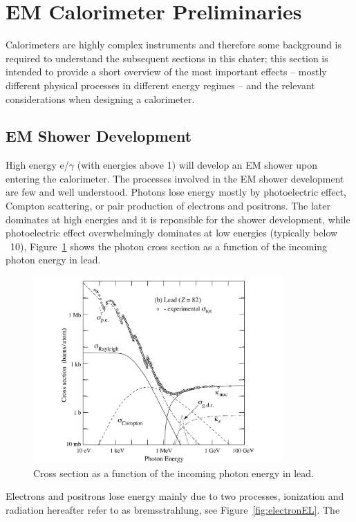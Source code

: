 \section{EM Calorimeter Preliminaries}\label{prelim-cal}
Calorimeters are highly complex instruments and therefore some
background is required to understand the subsequent sections in this
chater; this section is intended to provide a short overview of the
most important effects -- mostly different physical processes in
different energy regimes -- and the relevant considerations when
designing a calorimeter.
\subsection{EM Shower Development}
High energy e/$\gamma$ (with energies above 1\GeV) will develop an EM
shower upon entering the calorimeter. The processes involved in the EM
shower development are few and well understood. Photons lose energy
mostly by photoelectric effect, Compton scattering, or pair production
of electrons and positrons. The later dominates at high energies and
it is reponsible for the shower development, while
photoelectric effect overwhelmingly dominates at low energies
(typically below ~10\MeV), Figure~\ref{fig:photonEL} shows the photon cross
section as a function of the incoming photon energy in lead.
\begin{figure}[h] \centering
\includegraphics[width=0.85\textwidth]{calorimetry/PhotonXsec.pdf}
\caption{Cross
section as a function of the incoming photon energy in lead.}
\label{fig:photonEL}
\end{figure} 
Electrons and positrons lose energy mainly due to two processes,
ionization and radiation hereafter refer to as bremsstrahlung, see Figure~\ref{fig:electronEL}. The
